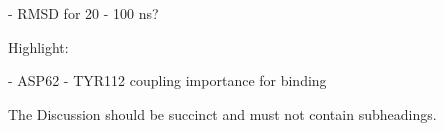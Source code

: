 \documentclass[fleqn,10pt]{wlscirep}
\begin{document}
     - RMSD for 20 - 100 ns?

Highlight:

  - ASP62 - TYR112 coupling importance for binding

The Discussion should be succinct and must not contain subheadings.



%









\end{document}
